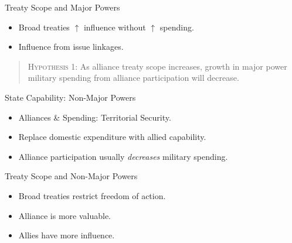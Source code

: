 \documentclass{beamer}
\begin{document}
\begin{frame}{Treaty Scope and Major Powers}

\begin{itemize} 
\item Broad treaties $\uparrow$ influence without $\uparrow$ spending.
\pause
\item Influence from issue linkages. 
\end{itemize} 


\end{frame}




\begin{frame}[standout]


\begin{quote}
\textsc{Hypothesis 1}: As alliance treaty scope increases, growth in major power military spending from alliance participation will decrease. 
\end{quote}

\end{frame} 


\begin{frame}{State Capability: Non-Major Powers}

\begin{itemize}
\item Alliances \& Spending: Territorial Security.
\pause
\item Replace domestic expenditure with allied capability.
\pause
\item Alliance participation usually \emph{decreases} military spending. 
\end{itemize} 

\end{frame}


\begin{frame}{Treaty Scope and Non-Major Powers}

\begin{itemize}
\item Broad treaties restrict freedom of action.
\pause 
\item Alliance is more valuable.
\pause
\item Allies have more influence.
\end{itemize} 

\end{frame}
\end{document}
